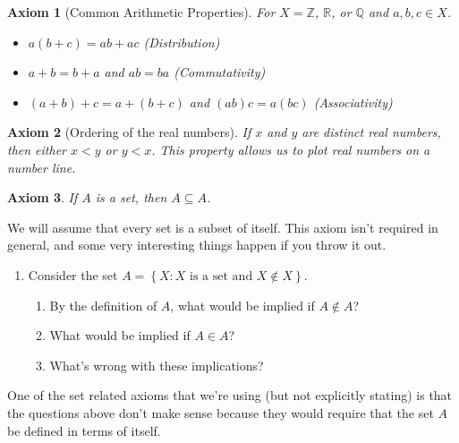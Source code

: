 \documentclass[12 pt]{article}
\newcommand{\R}{\mathbb{R}}
\newcommand{\Z}{\mathbb{Z}}
\newcommand{\Q}{\mathbb{Q}}
\newcommand{\set}[1]{\left\{#1\right\}}
\newcommand{\esub}{\subseteq}
\theoremstyle{definition}
\theoremstyle{plain}
\theoremstyle{mytheorem}
\theoremstyle{myexample}
\theoremstyle{mydefinition}
\newtheorem{axiom}{Axiom}[]
\begin{document}
\begin{axiom}[Common Arithmetic Properties]  For $X = \Z$, $\R$, or $\Q$ and $a,b,c \in X$.
		\begin{itemize}
		\item $a(b+c) = ab+ac$  (\textit{Distribution}) 
		\item $a+b=b+a$ and $ab=ba$  (\textit{Commutativity})
		\item $(a+b)+c=a+(b+c)$ and $(ab)c=a(bc)$  (\textit{Associativity})
		\end{itemize}
\end{axiom}
	
\begin{axiom}[Ordering of the real numbers] If $x$ and $y$ are \textit{distinct} real numbers, then either $x<y$ or $y<x$.  This property allows us to plot real numbers on a number line.
\end{axiom}
	
\begin{axiom} If $A$ is a set, then $A \esub A$.
\end{axiom}
	We will assume that every set is a subset of itself.  This axiom isn't required in general, and some very interesting things happen if you throw it out.\\
	
	\begin{enumerate}[resume]
	\item Consider the set $A = \set{X : X \text{ is a set and } X \not\in X}$.
	\begin{enumerate}[label=(\roman*)]
	\item By the definition of $A$, what would be implied if $A \not\in A$?
	\vspace{.5in}
	\item What would be implied if $A \in A$?
	\vspace{.5in}
	\item What's wrong with these implications?
	\vspace{.5in}
	\end{enumerate}
	\end{enumerate}
	One of the set related axioms that we're using (but not explicitly stating) is that the questions above don't make sense because they would require that the set $A$ be defined in terms of itself.  
	
\end{document}
